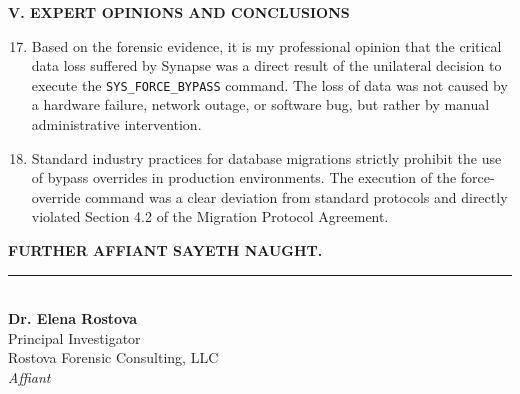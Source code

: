 \documentclass[12pt,letterpaper]{article}
\begin{document}
\par\vspace{1.0em}

\begin{center}
  \textbf{\textcolor{LegalNavy}{\MakeUppercase{V. Expert Opinions and Conclusions}}}
\end{center}
\par\vspace{0.3em}

\begin{enumerate}[label=\arabic*., leftmargin=0.4in, rightmargin=0.1in, align=left]
  \setcounter{enumi}{16}
  \item Based on the forensic evidence, it is my professional opinion that the critical data loss suffered by Synapse was a direct result of the unilateral decision to execute the \texttt{SYS\_FORCE\_BYPASS} command. The loss of data was not caused by a hardware failure, network outage, or software bug, but rather by manual administrative intervention.
  
  \item Standard industry practices for database migrations strictly prohibit the use of bypass overrides in production environments. The execution of the force-override command was a clear deviation from standard protocols and directly violated Section 4.2 of the Migration Protocol Agreement.
\end{enumerate}

\par\vspace{1.5em}
\noindent
\textbf{FURTHER AFFIANT SAYETH NAUGHT.}

\par\vspace{2.0em}
\noindent
\begin{minipage}[t]{0.45\textwidth}
  \hfill
\end{minipage}
\hfill
\begin{minipage}[t]{0.5\textwidth}
  \begin{flushleft}
    \rule{\textwidth}{0.8pt} \\
    \textbf{Dr. Elena Rostova} \\
    Principal Investigator \\
    Rostova Forensic Consulting, LLC \\
    \textit{Affiant}
  \end{flushleft}
\end{minipage}

\par\vspace{2.0em}
\end{document}
